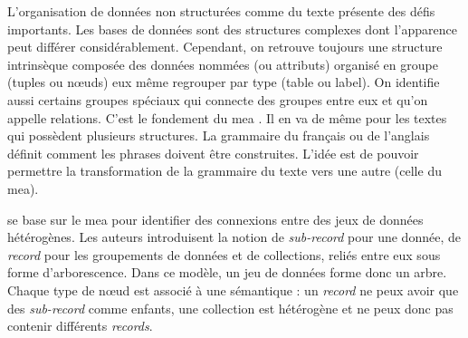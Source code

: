 L'organisation de données non structurées comme du texte présente des défis importants.
Les bases de données sont des structures complexes dont l'apparence peut différer considérablement.
Cependant, on retrouve toujours une structure intrinsèque composée des données nommées (ou attributs) organisé en groupe (tuples ou nœuds) eux même regrouper par type (table ou label).
On identifie aussi certains groupes spéciaux qui connecte des groupes entre eux et qu'on appelle relations.
C'est le fondement du \gls{mea} \cite{chenEntityrelationshipModelUnified1976}.
Il en va de même pour les textes qui possèdent plusieurs structures.
La grammaire du français ou de l'anglais définit comment les phrases doivent être construites.
L'idée est de pouvoir permettre la transformation de la grammaire du texte vers une autre (celle du \gls{mea}).

\cite{barretGenericAbstractionsData2021} se base sur le \gls{mea} pour identifier des connexions entre des jeux de données hétérogènes.
Les auteurs introduisent la notion de \emph{sub-record} pour une donnée, de \emph{record} pour les groupements de données et de collections, reliés entre eux sous forme d'arborescence.
Dans ce modèle, un jeu de données forme donc un arbre.
Chaque type de nœud est associé à une sémantique : un \emph{record} ne peux avoir que des \emph{sub-record} comme enfants, une collection est hétérogène et ne peux donc pas contenir différents \emph{records}.

